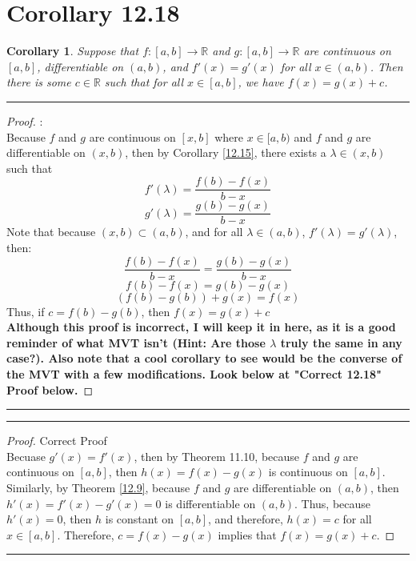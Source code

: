 \documentclass[openany, amssymb, psamsfonts]{amsart}
\newcommand{\bbR}{\mathbb{R}}
\newtheorem{cor}{Corollary}[section]
\theoremstyle{definition}
\numberwithin{equation}{section}
\begin{document}
 \section*{Corollary 12.18}
\begin{cor}
\label{12.18}
	Suppose that $f\colon [a, b] \to \bbR$ and $g\colon [a, b] \to \bbR$ are continuous on $[a, b]$, differentiable on $(a, b)$, and $f'(x) = g'(x)$ for all $x \in (a, b)$. Then there is some $c\in\bbR$ such that for all $x \in [a, b]$, we have $f(x) = g(x) + c$.
\end{cor} 
\vspace{4pt}     \hrule   \vspace{4pt} \begin{proof}:\\
Because $f$ and $g$ are continuous on $[x,b]$ where $x\in [a,b)$ and $f$ and $g$ are differentiable on $(x,b)$, then by Corollary \ref{12.15}, there exists a $\lambda\in (x,b)$ such that \[f'(\lambda) = \frac{f(b) - f(x)}{b-x}\] \[g'(\lambda) = \frac{g(b) - g(x)}{b-x}\] Note that because $(x,b)\subset (a,b)$, and for all $\lambda \in (a,b)$, $f'(\lambda) = g'(\lambda)$, then:
\[\frac{f(b) - f(x)}{b-x} = \frac{g(b) - g(x)}{b-x}\]
\[f(b) - f(x) = g(b) - g(x)\]
\[(f(b) - g(b)) + g(x) = f(x)\]
Thus, if $c=f(b) - g(b)$, then $f(x) = g(x) + c$\\
\textbf{Although this proof is incorrect, I will keep it in here, as it is a good reminder of what MVT isn't (Hint: Are those $\lambda$ truly the same in any case?). Also note that a cool corollary to see would be the converse of the MVT with a few modifications. Look below at "Correct 12.18" Proof below.}
\end{proof}\vspace{4pt}     \hrule   \vspace{4pt}
\vspace{4pt}     \hrule   \vspace{4pt} \begin{proof} Correct Proof\\
Becuase $g'(x) = f'(x)$, then by Theorem 11.10, because $f$ and $g$ are continuous on $[a,b]$, then $h(x) = f(x) - g(x)$ is continuous on $[a,b]$. Similarly, by Theorem \ref{12.9}, because $f$ and $g$ are differentiable on $(a,b)$, then $h'(x) = f'(x) - g'(x) = 0$ is differentiable on $(a,b)$. Thus, because $h'(x) = 0$, then $h$ is constant on $[a,b]$, and therefore, $h(x) = c$ for all $x \in [a,b]$. Therefore, $c = f(x) - g(x)$ implies that $f(x) = g(x) + c$.
\end{proof}\vspace{4pt}     \hrule   \vspace{4pt}
\end{document}
